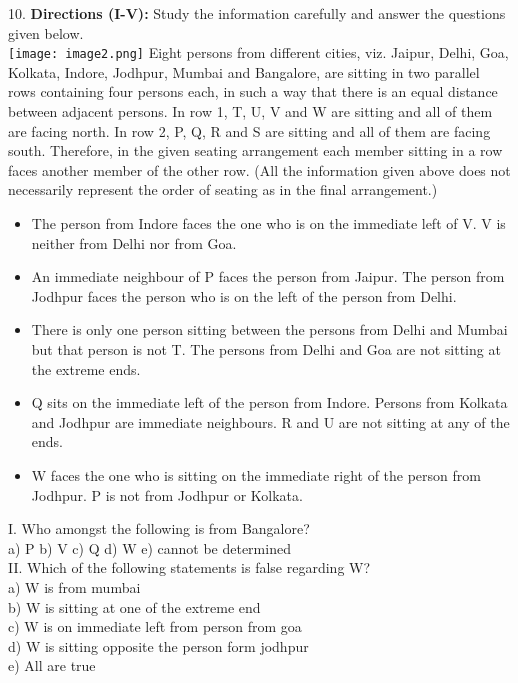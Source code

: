 \documentclass[
]{article}
\begin{document}
10. \textbf{Directions (I-V):} Study the information carefully and answer the questions given below.\\
\texttt{[image: image2.png]}
Eight persons from different cities, viz. Jaipur, Delhi, Goa, Kolkata, Indore, Jodhpur,
Mumbai and Bangalore, are sitting in two parallel rows containing four persons each, in
such a way that there is an equal distance between adjacent persons. In row 1, T, U, V and
W are sitting and all of them are facing north. In row 2, P, Q, R and S are sitting and all of
them are facing south. Therefore, in the given seating arrangement each member sitting in a
row faces another member of the other row. (All the information given above does not
necessarily represent the order of seating as in the final arrangement.)\\
\begin{itemize}
\item The person from Indore faces the one who is on the immediate left of V. V is neither
from Delhi nor from Goa.
\item An immediate neighbour of P faces the person from Jaipur. The person from Jodhpur
faces the person who is on the left of the person from Delhi.
\item There is only one person sitting between the persons from Delhi and Mumbai but that
person is not T. The persons from Delhi and Goa are not sitting at the extreme ends.
\item Q sits on the immediate left of the person from Indore. Persons from Kolkata and
Jodhpur are immediate neighbours. R and U are not sitting at any of the ends.
\item W faces the one who is sitting on the immediate right of the person from Jodhpur. P is
not from Jodhpur or Kolkata.
\end{itemize}

I. Who amongst the following is from Bangalore?\\
a) P \hspace{2mm}b) V \hspace{2mm}c) Q \hspace{2mm}d) W \hspace{2mm}e) cannot be determined\\

II. Which of the following statements is false regarding W?\\
a) W is from mumbai\\
b) W is sitting at one of the extreme end\\
c) W is on immediate left from person from goa\\
d) W is sitting opposite the person form jodhpur\\
e) All are true\\
\end{document}
